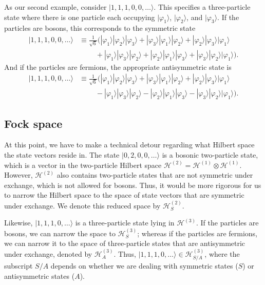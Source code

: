 \documentclass[pra,12pt]{revtex4}
\begin{document}
As our second example, consider $|1,1,1,0,0,\dots\rangle$.  This
specifies a three-particle state where there is one particle each
occupying $|\varphi_1\rangle$, $|\varphi_2\rangle$, and
$|\varphi_3\rangle$.  If the particles are bosons, this corresponds to
the symmetric state
$$\begin{aligned}|1,1,1,0,0,\dots\rangle &\equiv \frac{1}{\sqrt{6}}\Big(|\varphi_1\rangle|\varphi_2\rangle|\varphi_3\rangle + |\varphi_3\rangle|\varphi_1\rangle|\varphi_2\rangle + |\varphi_2\rangle|\varphi_3\rangle|\varphi_1\rangle \\&\;\qquad+ |\varphi_1\rangle|\varphi_3\rangle|\varphi_2\rangle + |\varphi_2\rangle|\varphi_1\rangle|\varphi_3\rangle + |\varphi_3\rangle|\varphi_2\rangle|\varphi_1\rangle \Big).
\end{aligned}$$
And if the particles are fermions, the appropriate antisymmetric state
is
$$\begin{aligned}|1,1,1,0,0,\dots\rangle &\equiv \frac{1}{\sqrt{6}} \Big(|\varphi_1\rangle|\varphi_2\rangle|\varphi_3\rangle + |\varphi_3\rangle|\varphi_1\rangle|\varphi_2\rangle + |\varphi_2\rangle|\varphi_3\rangle|\varphi_1\rangle \\&\;\qquad - |\varphi_1\rangle|\varphi_3\rangle|\varphi_2\rangle - |\varphi_2\rangle|\varphi_1\rangle|\varphi_3\rangle - |\varphi_3\rangle|\varphi_2\rangle|\varphi_1\rangle\Big).
\end{aligned}$$

\subsection{Fock space}

At this point, we have to make a technical detour regarding what
Hilbert space the state vectors reside in.  The state
$|0,2,0,0,\dots\rangle$ is a bosonic two-particle state, which is a
vector in the two-particle Hilbert space $\mathscr{H}^{(2)} =
\mathscr{H}^{(1)}\otimes \mathscr{H}^{(1)}$.  However,
$\mathscr{H}^{(2)}$ also contains two-particle states that are not
symmetric under exchange, which is not allowed for bosons.  Thus, it
would be more rigorous for us to narrow the Hilbert space to the space
of state vectors that are symmetric under exchange.  We denote this
reduced space by $\mathscr{H}^{(2)}_S$.

Likewise, $|1,1,1,0,\dots\rangle$ is a three-particle state lying in
$\mathscr{H}^{(3)}$.  If the particles are bosons, we can narrow the
space to $\mathscr{H}^{(3)}_S$; whereas if the particles are fermions,
we can narrow it to the space of three-particle states that are
antisymmetric under exchange, denoted by $\mathscr{H}^{(3)}_A$.  Thus,
$|1,1,1,0,\dots\rangle \in \mathscr{H}^{(3)}_{S/A}$, where the
subscript $S/A$ depends on whether we are dealing with symmetric
states ($S$) or antisymmetric states ($A$).
\end{document}
